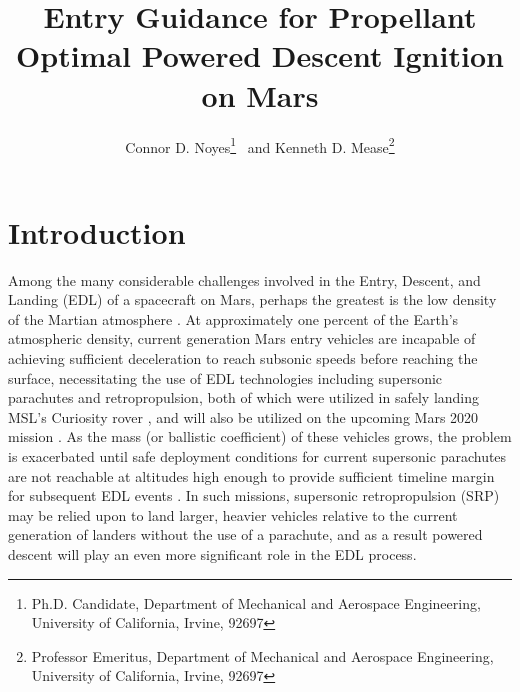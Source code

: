 \documentclass[letterpaper, preprint, paper,11pt]{AAS}
\title{Entry Guidance for Propellant Optimal Powered Descent Ignition on Mars}
\begin{document}
\author{Connor D. Noyes\thanks{Ph.D. Candidate, Department of Mechanical and Aerospace Engineering, University of California, Irvine, 92697} \ and Kenneth D. Mease\thanks{Professor Emeritus, Department of Mechanical and Aerospace Engineering, University of California, Irvine, 92697}}
\maketitle




\section{Introduction}
Among the many considerable challenges involved in the Entry, Descent, and Landing (EDL) of a spacecraft on Mars, perhaps the greatest is the low density of the Martian atmosphere \cite{BraunMarsEDL, joel_dissertation}. At approximately one percent of the Earth's atmospheric density, current generation Mars entry vehicles are incapable of achieving sufficient deceleration to reach subsonic speeds before reaching the surface, necessitating the use of EDL technologies including supersonic parachutes and retropropulsion, both of which were utilized in safely landing MSL's Curiosity rover \cite{MSL_EDL}, and will also be utilized on the upcoming Mars 2020 mission \cite{M2020_EDL}. As the mass (or ballistic coefficient) of these vehicles grows, the problem is exacerbated until safe deployment conditions for current supersonic parachutes are not reachable at altitudes high enough to provide sufficient timeline margin for subsequent EDL events \cite{BraunMarsEDL}. In such missions, supersonic retropropulsion (SRP) may be relied upon to land larger, heavier vehicles relative to the current generation of landers without the use of a parachute, and as a result powered descent will play an even more significant role in the EDL process.  

\end{document}
